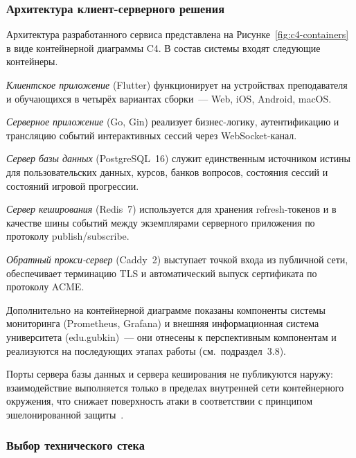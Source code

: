 \subsubsection{Архитектура клиент-серверного решения}

Архитектура разработанного сервиса представлена
на Рисунке~\ref{fig:c4-containers} в виде контейнерной диаграммы
C4. В состав системы входят следующие контейнеры.


\emph{Клиентское приложение} (Flutter) функционирует на устройствах
преподавателя и обучающихся в четырёх вариантах сборки~--- Web, iOS,
Android, macOS.

\emph{Серверное приложение} (Go, Gin) реализует бизнес-логику,
аутентификацию и трансляцию событий интерактивных сессий через
WebSocket-канал.

\emph{Сервер базы данных} (PostgreSQL~16) служит единственным
источником истины для пользовательских данных, курсов, банков
вопросов, состояния сессий и состояний игровой прогрессии.

\emph{Сервер кеширования} (Redis~7) используется для хранения
refresh-токенов и в качестве шины событий между экземплярами
серверного приложения по протоколу publish/subscribe.

\emph{Обратный прокси-сервер} (Caddy~2) выступает точкой входа
из публичной сети, обеспечивает терминацию TLS и автоматический
выпуск сертификата по протоколу ACME.

Дополнительно на контейнерной диаграмме показаны компоненты
системы мониторинга (Prometheus, Grafana) и внешняя информационная
система университета (edu.gubkin)~--- они отнесены к перспективным
компонентам и реализуются на последующих этапах работы
(см.~подраздел~3.8).

Порты сервера базы данных и сервера кеширования не публикуются
наружу: взаимодействие выполняется только в пределах внутренней
сети контейнерного окружения, что снижает поверхность атаки
в соответствии с принципом эшелонированной защиты~\cite{owasp_top10}.

\subsubsection{Выбор технического стека}


